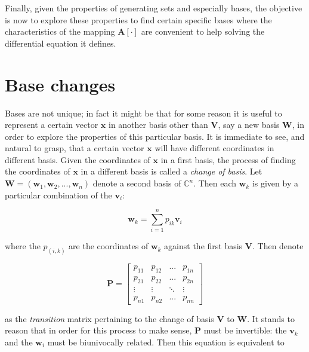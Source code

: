 	Finally, given the properties of generating sets and especially bases, the objective is now to explore these properties to find certain specific bases where the characteristics of the mapping $\mathbf{A}\left[\cdot\right]$ are convenient to help solving the differential equation it defines.

\section{Base changes} %

	Bases are not unique; in fact it might be that for some reason it is useful to represent a certain vector $\mathbf{x}$ in another basis other than $\mathbf{V}$, say a new basis $\mathbf{W}$, in order to explore the properties of this particular basis. It is immediate to see, and natural to grasp, that a certain vector $\mathbf{x}$ will have different coordinates in different basis. Given the coordinates of $\mathbf{x}$ in a first basis, the process of finding the coordinates of $\mathbf{x}$ in a different basis is called a \textit{change of basis}. Let $\mathbf{W} = \left(\mathbf{w}_1,\mathbf{w}_2,...,\mathbf{w}_n\right)$ denote a second basis of $\mathbb{C}^n$. Then each $\mathbf{w}_k$ is given by a particular combination of the $\mathbf{v}_i$:

\begin{equation} \mathbf{w}_k = \sum\limits_{i=1}^n p_{ik} \mathbf{v}_i \end{equation}

	\noindent where the $p_{\left(i,k\right)}$ are the coordinates of $\mathbf{w}_k$ against the first basis $\mathbf{V}$. Then denote

\begin{equation} \mathbf{P} = \left[\begin{array}{cccc} p_{11} & p_{12} & ... & p_{1n} \\ [5mm] p_{21} & p_{22} & ... & p_{2n} \\[5mm] \vdots & \vdots & \ddots & \vdots \\[5mm] p_{n1} & p_{n2} & ... & p_{nn} \end{array}\right] \end{equation}

	\noindent as the \textit{transition} matrix pertaining to the change of basis $\mathbf{V}$ to $\mathbf{W}$. It stands to reason that in order for this process to make sense, $\mathbf{P}$ must be invertible: the $\mathbf{v}_k$ and the $\mathbf{w}_i$ must be biunivocally related. Then this equation is equivalent to


